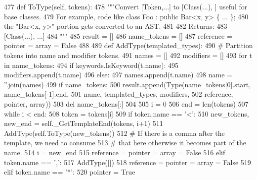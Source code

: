 \begin{DoxyCode}
477     \textcolor{keyword}{def }ToType(self, tokens):
478         \textcolor{stringliteral}{"""Convert [Token,...] to [Class(...), ] useful for base classes.}
479 \textcolor{stringliteral}{        For example, code like class Foo : public Bar<x, y> \{ ... \};}
480 \textcolor{stringliteral}{        the "Bar<x, y>" portion gets converted to an AST.}
481 \textcolor{stringliteral}{}
482 \textcolor{stringliteral}{        Returns:}
483 \textcolor{stringliteral}{          [Class(...), ...]}
484 \textcolor{stringliteral}{        """}
485         result = []
486         name\_tokens = []
487         reference = pointer = array = \textcolor{keyword}{False}
488 
489         \textcolor{keyword}{def }AddType(templated\_types):
490             \textcolor{comment}{# Partition tokens into name and modifier tokens.}
491             names = []
492             modifiers = []
493             \textcolor{keywordflow}{for} t \textcolor{keywordflow}{in} name\_tokens:
494                 \textcolor{keywordflow}{if} keywords.IsKeyword(t.name):
495                     modifiers.append(t.name)
496                 \textcolor{keywordflow}{else}:
497                     names.append(t.name)
498             name = \textcolor{stringliteral}{''}.join(names)
499             \textcolor{keywordflow}{if} name\_tokens:
500                 result.append(Type(name\_tokens[0].start, name\_tokens[-1].end,
501                                    name, templated\_types, modifiers,
502                                    reference, pointer, array))
503             del name\_tokens[:]
504 
505         i = 0
506         end = len(tokens)
507         \textcolor{keywordflow}{while} i < end:
508             token = tokens[i]
509             \textcolor{keywordflow}{if} token.name == \textcolor{stringliteral}{'<'}:
510                 new\_tokens, new\_end = self.\_GetTemplateEnd(tokens, i+1)
511                 AddType(self.ToType(new\_tokens))
512                 \textcolor{comment}{# If there is a comma after the template, we need to consume}
513                 \textcolor{comment}{# that here otherwise it becomes part of the name.}
514                 i = new\_end
515                 reference = pointer = array = \textcolor{keyword}{False}
516             \textcolor{keywordflow}{elif} token.name == \textcolor{stringliteral}{','}:
517                 AddType([])
518                 reference = pointer = array = \textcolor{keyword}{False}
519             \textcolor{keywordflow}{elif} token.name == \textcolor{stringliteral}{'*'}:
520                 pointer = \textcolor{keyword}{True}

\end{DoxyCode}
